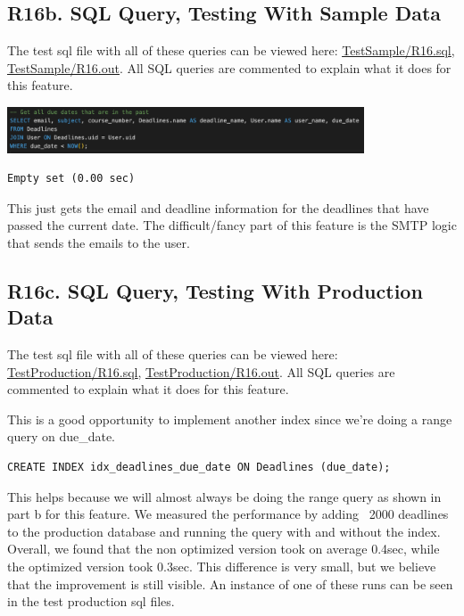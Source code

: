 \documentclass[12pt, a4paper]{article}
\begin{document}
\subsection*{R16b. SQL Query, Testing With Sample Data}
The test sql file with all of these queries can be viewed here: \underline{\href{https://github.com/Kggupta/DegreeMap/tree/main/Database/Queries/TestSample}{TestSample/R16.sql}}, \underline{\href{https://github.com/Kggupta/DegreeMap/tree/main/Database/Queries/TestSample}{TestSample/R16.out}}. All SQL queries are commented to explain what it does for this feature.
\begin{center}
    \includegraphics[width=400px]{R16/q1}
    \begin{verbatim}
Empty set (0.00 sec)
    \end{verbatim}
\end{center}
This just gets the email and deadline information for the deadlines that have passed the current date.
The difficult/fancy part of this feature is the SMTP logic that sends the emails to the user.
\subsection*{R16c. SQL Query, Testing With Production Data}
The test sql file with all of these queries can be viewed here: \underline{\href{https://github.com/Kggupta/DegreeMap/tree/main/Database/Queries/TestProduction}{TestProduction/R16.sql}}, \underline{\href{https://github.com/Kggupta/DegreeMap/tree/main/Database/Queries/TestProduction}{TestProduction/R16.out}}. All SQL queries are commented to explain what it does for this feature.

This is a good opportunity to implement another index since we're doing a range query on due\_date.

\begin{verbatim}
CREATE INDEX idx_deadlines_due_date ON Deadlines (due_date);
\end{verbatim}
This helps because we will almost always be doing the range query as shown in part b for this feature. We measured the performance by adding ~2000 deadlines to the production database and running the query with and without the index. Overall, we found that the non optimized version took on average 0.4sec, while the optimized version took 0.3sec. This difference is very small, but we believe that the improvement is still visible. An instance of one of these runs can be seen in the test production sql files.
\end{document}
